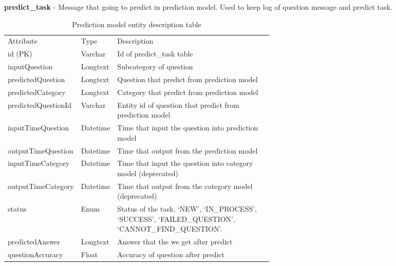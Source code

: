 \documentclass[12pt,oneside,openright,a4paper]{cpe-english-project}
\begin{document}
\textbf{predict\_task} - Message that going to predict in prediction model. Used to keep log of question message and predict task.
\begin{table}[ht]
	\caption{Prediction model entity description table}
	\label{tab:Prediction model entity description table}
\begin{adjustbox}{width=\textwidth}
\begin{tabular}{llp{0.6\linewidth}l}
\rowcolor[HTML]{5B9BD5} 
Attribute         & Type     & Description                                                                                                 \\
\rowcolor[HTML]{DEEAF6} 
id (PK)           & Varchar  & Id of predict\_task table                                                                                   \\
inputQuestion     & Longtext  & Subcategory of question                                                                                     \\
\rowcolor[HTML]{DEEAF6} 
predictedQuestion & Longtext  & Question that predict from prediction model																	\\
predictedCategory & Longtext  & Category that predict from prediction model                   												\\
\rowcolor[HTML]{DEEAF6} 
predictedQuestionId & Varchar  & Entity id of question that predict from prediction model													\\
inputTimeQuestion      & Datetime & Time that input the question into prediction model							                                \\
\rowcolor[HTML]{DEEAF6} 
outputTimeQuestion      & Datetime & Time that output from the prediction model							                                \\
inputTimeCategory      & Datetime & Time that input the question into category model (deprecated)							               \\
\rowcolor[HTML]{DEEAF6} 
outputTimeCategory      & Datetime & Time that output from the category model (deprecated)							               			\\
status            & Enum     & Status of the task,   ‘NEW’, ‘IN\_PROCESS’, ‘SUCCESS’, ‘FAILED\_QUESTION’, ‘CANNOT\_FIND\_QUESTION’.        \\
\rowcolor[HTML]{DEEAF6} 
predictedAnswer  & Longtext & Answer that the we get after predict	\\
questionAccuracy & Float & Accuracy of question after predict \\

\end{tabular}
\end{adjustbox}
\end{table}
\end{document}
